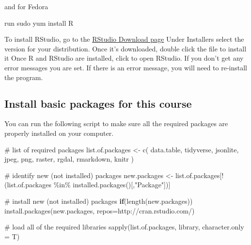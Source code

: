 \documentclass[
  letterpaper,
]{book}
\newenvironment{Shaded}{\begin{snugshade}}{\end{snugshade}}
\newcommand{\AttributeTok}[1]{\textcolor[rgb]{0.40,0.45,0.13}{#1}}
\newcommand{\CommentTok}[1]{\textcolor[rgb]{0.37,0.37,0.37}{#1}}
\newcommand{\ControlFlowTok}[1]{\textcolor[rgb]{0.00,0.23,0.31}{\textbf{#1}}}
\newcommand{\ExtensionTok}[1]{\textcolor[rgb]{0.00,0.23,0.31}{#1}}
\newcommand{\FunctionTok}[1]{\textcolor[rgb]{0.28,0.35,0.67}{#1}}
\newcommand{\NormalTok}[1]{\textcolor[rgb]{0.00,0.23,0.31}{#1}}
\newcommand{\OtherTok}[1]{\textcolor[rgb]{0.00,0.23,0.31}{#1}}
\newcommand{\SpecialCharTok}[1]{\textcolor[rgb]{0.37,0.37,0.37}{#1}}
\newcommand{\StringTok}[1]{\textcolor[rgb]{0.13,0.47,0.30}{#1}}
\begin{document}
and for Fedora

\begin{Shaded}
\begin{Highlighting}[]
\ExtensionTok{run}\NormalTok{ sudo yum install R}
\end{Highlighting}
\end{Shaded}

To install RStudio, go to the
\href{https://www.rstudio.com/products/rstudio/download/\#download}{RStudio
Download page} Under Installers select the version for your
distribution. Once it's downloaded, double click the file to install it
Once R and RStudio are installed, click to open RStudio. If you don't
get any error messages you are set. If there is an error message, you
will need to re-install the program.

\subsection*{Install basic packages for this
course}\label{install-basic-packages-for-this-course}

You can run the following script to make sure all the required packages
are properly installed on your computer.

\begin{Shaded}
\begin{Highlighting}[]
\CommentTok{\# list of required packages}
\NormalTok{list.of.packages }\OtherTok{\textless{}{-}} \FunctionTok{c}\NormalTok{(}
  \StringTok{\textquotesingle{}data.table\textquotesingle{}}\NormalTok{,}
  \StringTok{\textquotesingle{}tidyverse\textquotesingle{}}\NormalTok{,}
  \StringTok{\textquotesingle{}jsonlite\textquotesingle{}}\NormalTok{,}
  \StringTok{\textquotesingle{}jpeg\textquotesingle{}}\NormalTok{,}
  \StringTok{\textquotesingle{}png\textquotesingle{}}\NormalTok{,}
  \StringTok{\textquotesingle{}raster\textquotesingle{}}\NormalTok{,}
  \StringTok{\textquotesingle{}rgdal\textquotesingle{}}\NormalTok{,}
  \StringTok{\textquotesingle{}rmarkdown\textquotesingle{}}\NormalTok{, }
  \StringTok{\textquotesingle{}knitr\textquotesingle{}}
\NormalTok{)}

\CommentTok{\# identify new (not installed) packages}
\NormalTok{new.packages }\OtherTok{\textless{}{-}}\NormalTok{ list.of.packages[}\SpecialCharTok{!}\NormalTok{(list.of.packages }\SpecialCharTok{\%in\%} \FunctionTok{installed.packages}\NormalTok{()[,}\StringTok{"Package"}\NormalTok{])]}

\CommentTok{\# install new (not installed) packages}
\ControlFlowTok{if}\NormalTok{(}\FunctionTok{length}\NormalTok{(new.packages)) }
  \FunctionTok{install.packages}\NormalTok{(new.packages, }
                   \AttributeTok{repos=}\StringTok{\textquotesingle{}http://cran.rstudio.com/\textquotesingle{}}\NormalTok{)}

\CommentTok{\# load all of the required libraries}
\FunctionTok{sapply}\NormalTok{(list.of.packages, library, }\AttributeTok{character.only =}\NormalTok{ T)}
\end{Highlighting}
\end{Shaded}
\end{document}
